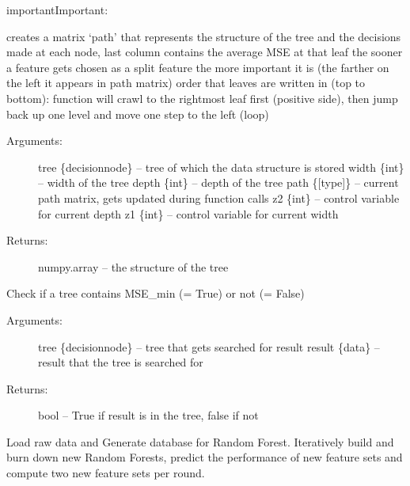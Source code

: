 \documentclass[letterpaper,10pt,english]{sphinxmanual}
\begin{document}
\begin{sphinxadmonition}{important}{Important:}
\begin{fulllineitems}
creates a matrix `path' that represents the structure of the tree and the decisions made at each node, last column contains the average MSE at that leaf
the sooner a feature gets chosen as a split feature the more important it is (the farther on the left it appears in path matrix)
order that leaves are written in (top to bottom): function will crawl to the rightmost leaf first (positive side), then jump back up one level and move one step to the left (loop)
\begin{description}
\item[{Arguments:}] \leavevmode
tree \{decisionnode\} -- tree of which the data structure is stored
width \{int\} -- width of the tree
depth \{int\} -- depth of the tree
path \{{[}type{]}\} -- current path matrix, gets updated during function calls
z2 \{int\} -- control variable for current depth
z1 \{int\} -- control variable for current width

\item[{Returns:}] \leavevmode
numpy.array -- the structure of the tree

\end{description}

\end{fulllineitems}

\label{\detokenize{DT:checkpath}}

\begin{fulllineitems}
\label{\detokenize{DT:ForestFire.Main.check_path}}
Check if a tree contains MSE\_min (= True) or not (= False)
\begin{description}
\item[{Arguments:}] \leavevmode
tree \{decisionnode\} -- tree that gets searched for result
result \{data\} -- result that the tree is searched for

\item[{Returns:}] \leavevmode
bool -- True if result is in the tree, false if not

\end{description}

\end{fulllineitems}



\begin{fulllineitems}
Load raw data and Generate database for Random Forest. Iteratively build and burn down new Random Forests, predict the performance of new feature sets and compute two new feature sets per round.


\end{fulllineitems}
\end{sphinxadmonition}
\end{document}
